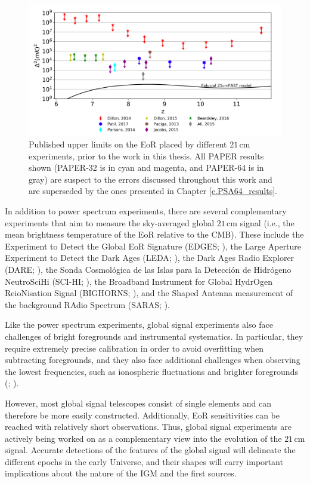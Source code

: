 \begin{figure}
    \centering
    \includegraphics[width=1\textwidth]{plots/statusfield.png}
    \caption{Published upper limits on the EoR placed by different $21$\,cm experiments, prior to the work in this thesis. All PAPER results shown (PAPER-32 is in cyan and magenta, and PAPER-64 is in gray) are suspect to the errors discussed throughout this work and are superseded by the ones presented in Chapter \ref{c.PSA64_results}.}
    \label{fig:statusfield}
\end{figure}

In addition to power spectrum experiments, there are several complementary experiments that aim to measure the sky-averaged global $21$\,cm signal (i.e., the mean brightness temperature of the EoR relative to the CMB). These include the Experiment to Detect the Global EoR Signature (EDGES; \citealt{bowman2010}), the Large Aperture Experiment to Detect the Dark Ages (LEDA; \citealt{bernardi_et_al2016}), the Dark Ages Radio Explorer (DARE; \citealt{burns2012}), the Sonda Cosmol\'ogica de las Islas para la Detecci\'on de Hidr\'ogeno NeutroSciHi (SCI-HI; \citealt{voytek2014}), the Broadband Instrument for Global HydrOgen ReioNisation Signal (BIGHORNS; \citealt{sokolowski2015}), and the Shaped Antenna measurement of the background RAdio Spectrum (SARAS; \citealt{patra2015}).

Like the power spectrum experiments, global signal experiments also face challenges of bright foregrounds and instrumental systematics. In particular, they require extremely precise calibration in order to avoid overfitting when subtracting foregrounds, and they also face additional challenges when observing the lowest frequencies, such as ionospheric fluctuations and brighter foregrounds (\citealt{vedantham_et_al2014}; \citealt{datta_et_al2014}).

However, most global signal telescopes consist of single elements and can therefore be more easily constructed. Additionally, EoR sensitivities can be reached with relatively short observations. Thus, global signal experiments are actively being worked on as a complementary view into the evolution of the $21$\,cm signal. Accurate detections of the features of the global signal will delineate the different epochs in the early Universe, and their shapes will carry important implications about the nature of the IGM and the first sources.

